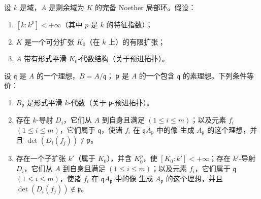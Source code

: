 \begin{theorem}[22.7.3]
\label{0.22.7.3-fr}
设 $k$ 是域，$A$ 是剩余域为 $K$ 的完备 Noether 局部环。假设：
\begin{enumerate}
  \item[$1^\circ$] $[k:k^p]<+\infty$（其中 $p$ 是 $k$ 的特征指数）；
  \item[$2^\circ$] $K$ 是一个可分扩张 $K_0$（在 $k$ 上）的有限扩张；
  \item[$3^\circ$] $A$ 带有形式平滑 $K_0$-代数结构（关于预进拓扑）。
\end{enumerate}
设 $\mathfrak q$ 是 $A$ 的一个理想，$B=A/\mathfrak q$；
$\mathfrak p$ 是 $A$ 的一个包含 $\mathfrak q$ 的素理想。下列条件等价：
\begin{enumerate}
  \item[a)] $B_{\mathfrak p}$ 是形式平滑 $k$-代数（关于
  $\mathfrak p$-预进拓扑）。
  \item[b)] 存在 $k$-导射 $D_i$，它们从 $A$ 到自身且满足
  $(1\leq i\leq m)$；以及元素 $f_i$ $(1\leq i\leq m)$，它们属于
  $\mathfrak q$，使诸 $f_i$ 在 $\mathfrak qA_{\mathfrak p}$ 中的像
  生成 $A_{\mathfrak p}$ 的这个理想，并且
  $\det(D_i(f_j))\notin\mathfrak p$。
  \item[b')] 存在一个子扩张 $k'$（属于 $K_0$），并含 $K_0^p$，使
  $[K_0:k']<+\infty$；存在 $k'$-导射 $D_i$，它们从 $A$ 到自身且满足
  $(1\leq i\leq m)$；以及元素 $f_i$，它们属于 $\mathfrak q$
  $(1\leq i\leq m)$，使诸 $f_i$ 在 $\mathfrak qA_{\mathfrak p}$ 中的像
  生成 $A_{\mathfrak p}$ 的这个理想，并且
  $\det(D_i(f_j))\notin\mathfrak p$。
\end{enumerate}
\end{theorem}

